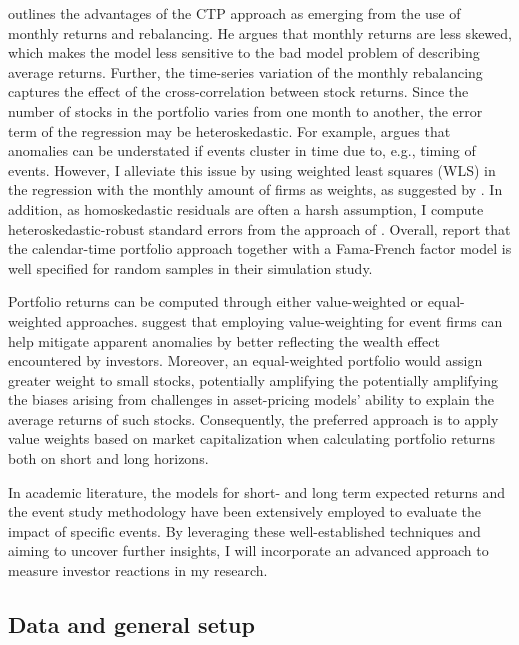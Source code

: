 \cite{fama1998_events} outlines the advantages of the CTP approach as emerging from the use of monthly returns and rebalancing. He argues that monthly returns are less skewed, which makes the model less sensitive to the bad model problem of describing average returns. Further, the time-series variation of the monthly rebalancing captures the effect of the cross-correlation between stock returns. Since the number of stocks in the portfolio varies from one month to another, the error term of the regression may be heteroskedastic. For example, \cite{ritter1995} argues that anomalies can be understated if events cluster in time due to, e.g., timing of events. However, I alleviate this issue by using weighted least squares (WLS) in the regression with the monthly amount of firms as weights, as suggested by \cite{Ang_event_method}. In addition, as homoskedastic residuals are often a harsh assumption, I compute heteroskedastic-robust standard errors from the approach of \cite{white1980heteroskedasticity}. Overall, \cite{lyon1999improved} report that the calendar-time portfolio approach together with a Fama-French factor model is well specified for random samples in their simulation study. 

Portfolio returns can be computed through either value-weighted or equal-weighted approaches. \cite{fama1998_events} suggest that employing value-weighting for event firms can help mitigate apparent anomalies by better reflecting the wealth effect encountered by investors. Moreover, an equal-weighted portfolio would assign greater weight to small stocks, potentially amplifying the potentially amplifying the biases arising from challenges in asset-pricing models' ability to explain the average returns of such stocks. Consequently, the preferred approach is to apply value weights based on market capitalization when calculating portfolio returns both on short and long horizons. 

In academic literature, the models for short- and long term expected returns and the event study methodology have been extensively employed to evaluate the impact of specific events. By leveraging these well-established techniques and aiming to uncover further insights, I will incorporate an advanced approach to measure investor reactions in my research.

\subsection{Data and general setup}

